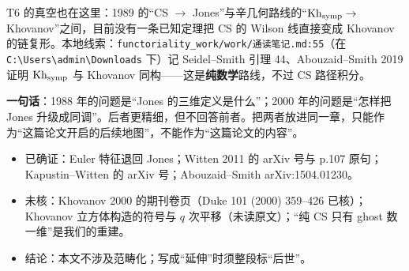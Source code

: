 T6 的真空也在这里：1989 的“CS $\to$ Jones”与辛几何路线的“$\mathrm{Kh}_{\rm symp}\to$ Khovanov”之间，目前没有一条已知定理把 CS 的 Wilson 线直接变成 Khovanov 的链复形。本地线索：\texttt{functoriality\_work/work/通读笔记.md:55}（在 \texttt{C:\textbackslash Users\textbackslash admin\textbackslash Downloads} 下）记 Seidel--Smith 引理 44、Abouzaid--Smith 2019 证明 $\mathrm{Kh}_{\rm symp}$ 与 Khovanov 同构——这是\textbf{纯数学}路线，不过 CS 路径积分。

\begin{keypoint}
\textbf{一句话}：1988 年的问题是“Jones 的三维定义是什么”；2000 年的问题是“怎样把 Jones 升级成同调”。后者更精细，但不回答前者。把两者放进同一章，只能作为“这篇论文开启的后续地图”，不能作为“这篇论文的内容”。
\end{keypoint}

\begin{boundary}
\begin{itemize}[leftmargin=1.4em]
\item 已确证：Euler 特征退回 Jones；Witten 2011 的 arXiv 号与 p.107 原句；Kapustin--Witten 的 arXiv 号；Abouzaid--Smith arXiv:1504.01230。
\item 未核：Khovanov 2000 的期刊卷页（Duke 101 (2000) 359--426 已核）；Khovanov 立方体构造的符号与 $q$ 次平移（未读原文）；“纯 CS 只有 ghost 数一维”是我们的重建。
\item 结论：本文不涉及范畴化；写成“延伸”时须整段标“后世”。
\end{itemize}
\end{boundary}
